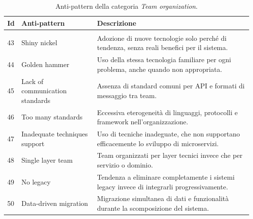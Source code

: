 \begin{table}[H]
\centering
\caption{Anti-pattern della categoria \textit{Team organization}.}
\label{tab:team_organization}
\small
\renewcommand{\arraystretch}{1.15}
\setlength{\tabcolsep}{7pt}

\begin{tabularx}{\textwidth}{
>{\centering\arraybackslash}p{0.8cm}
>{\RaggedRight\arraybackslash}p{3.8cm}
>{\RaggedRight\arraybackslash}X
}
\toprule
\textbf{Id} & \textbf{Anti-pattern} & \textbf{Descrizione} \\
\midrule

\multicolumn{3}{l}{\textit{Development}} \\
\cmidrule(lr){1-3}

43 & Shiny nickel
& Adozione di nuove tecnologie solo perché di tendenza, senza reali benefici per il sistema. \\

\addlinespace[0.3em]

44 & Golden hammer
& Uso della stessa tecnologia familiare per ogni problema, anche quando non appropriata. \\

\addlinespace[0.3em]

45 & Lack of communication standards
& Assenza di standard comuni per API e formati di messaggio tra team. \\

\addlinespace[0.3em]

46 & Too many standards
& Eccessiva eterogeneità di linguaggi, protocolli e framework nell’organizzazione. \\

\addlinespace[0.3em]

47 & Inadequate techniques support
& Uso di tecniche inadeguate, che non supportano efficacemente lo sviluppo di microservizi. \\

\addlinespace[0.3em]

48 & Single layer team
& Team organizzati per layer tecnici invece che per servizio o dominio. \\

\addlinespace[0.3em]

49 & No legacy
& Tendenza a eliminare completamente i sistemi legacy invece di integrarli progressivamente. \\

\addlinespace[0.3em]

50 & Data-driven migration
& Migrazione simultanea di dati e funzionalità durante la scomposizione del sistema. \\


\end{tabularx}
\end{table}
